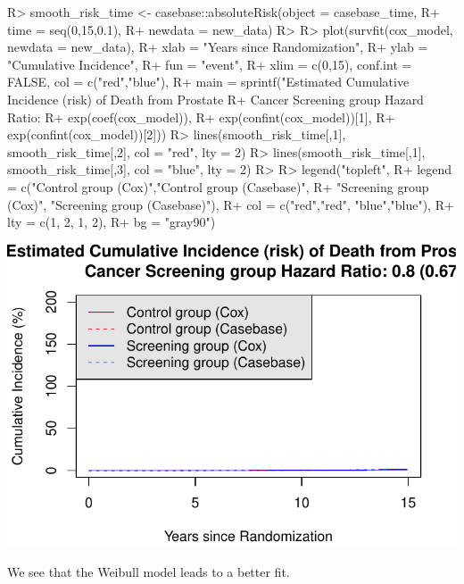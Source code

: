 \documentclass[
]{jss}
\begin{document}
\begin{CodeChunk}

\begin{CodeInput}
R> smooth_risk_time <- casebase::absoluteRisk(object = casebase_time, 
R+                                           time = seq(0,15,0.1), 
R+                                           newdata = new_data)
R> 
R> plot(survfit(cox_model, newdata = new_data),
R+      xlab = "Years since Randomization", 
R+      ylab = "Cumulative Incidence", 
R+      fun = "event",
R+      xlim = c(0,15), conf.int = FALSE, col = c("red","blue"), 
R+      main = sprintf("Estimated Cumulative Incidence (risk) of Death from Prostate 
R+                     Cancer Screening group Hazard Ratio: %
R+                     exp(coef(cox_model)), 
R+                     exp(confint(cox_model))[1], 
R+                     exp(confint(cox_model))[2]))
R> lines(smooth_risk_time[,1], smooth_risk_time[,2], col = "red", lty = 2)
R> lines(smooth_risk_time[,1], smooth_risk_time[,3], col = "blue", lty = 2)
R> 
R> legend("topleft", 
R+        legend = c("Control group (Cox)","Control group (Casebase)",
R+                   "Screening group (Cox)", "Screening group (Casebase)"), 
R+        col = c("red","red", "blue","blue"),
R+        lty = c(1, 2, 1, 2), 
R+        bg = "gray90")
\end{CodeInput}


\begin{center}\includegraphics{../figures/erspc-casebase-weibull-cif-1} \end{center}

\end{CodeChunk}

We see that the Weibull model leads to a better fit.
\end{document}

